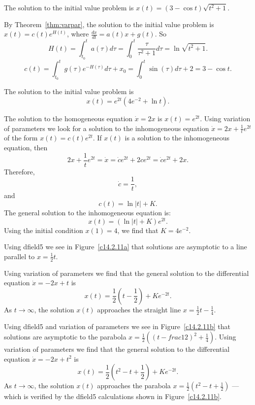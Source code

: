 \documentclass{ximera}
\begin{document}
 \ans The solution to the initial value problem is
$x(t) = (3 - \cos t)\sqrt{t^2 + 1}$.

\soln By Theorem~\ref{thm:varpar}, the
solution to the initial value problem is $x(t) = c(t)e^{H(t)}$, where
$\frac{dx}{dt} = a(t)x + g(t)$.  So
\[
H(t) = \int_{t_0}^t a(\tau)d\tau = \int_0^t\frac{\tau}{\tau^2 + 1}d\tau
= \ln\sqrt{t^2 + 1}.
\]
\[
c(t) = \int_{t_0}^t g(\tau)e^{-H(\tau)}d\tau + x_0
= \int_0^t \sin(\tau)d\tau + 2
= 3 - \cos t.
\]

 \ans The solution to the initial value problem is
\[
x(t) = e^{2t}(4e^{-2}+\ln t).
\]

\soln The solution to the homogeneous equation $\dot{x}=2x$ is $x(t)=e^{2t}$.
 Using variation of parameters we look for a solution to the inhomogeneous
equation $\dot{x}=2x+\frac{1}{t}e^{2t}$ of the form $x(t)=c(t)e^{2t}$.  If
$x(t)$ is a solution to the inhomogeneous equation, then
\[
2x+\frac{1}{t}e^{2t} =\dot{x}=\dot{c}e^{2t}+2ce^{2t} = \dot{c}e^{2t}+2x.
\]
Therefore, 
\[
\dot{c} = \frac{1}{t},
\]
and 
\[
c(t) = \ln|t| + K.
\]
The general solution to the inhomogeneous equation is:
\[
x(t) = (\ln|t| + K)e^{2t}.
\]
Using the initial condition $x(1)=4$, we find that $K=4e^{-2}$.



 Using {\sf dfield5} we see in Figure~\ref{c14.2.11a} that
solutions are asymptotic to a line parallel to $x=\frac{1}{2}t$.

\begin{figure}[htb]
     \centerline{%
     }
\end{figure} 
Using variation of parameters we find that the general solution to the
differential equation $\dot{x}=-2x+t$ is 
\[
x(t) = \frac{1}{2}\left(t-\frac{1}{2}\right) +Ke^{-2t}.
\]
As $t\to\infty$, the solution $x(t)$ approaches the straight line 
$x= \frac{1}{2}t-\frac{1}{4}$.

  Using {\sf dfield5} and variation of parameters we see in 
Figure~\ref{c14.2.11b} that solutions are asymptotic to the
parabola $x=\frac{1}{2}((t-frac{1}{2})^2+\frac{1}{4})$.
Using variation of parameters we find that the general solution to the
differential equation $\dot{x}=-2x+t^2$ is 
\[
x(t) = \frac{1}{2}\left(t^2-t+\frac{1}{2}\right) + Ke^{-2t}.
\]
As $t\to\infty$, the solution $x(t)$ approaches the parabola  
$x= \frac{1}{2}(t^2-t+\frac{1}{2})$ --- which is verified by the 
{\sf dfield5} calculations shown in Figure~\ref{c14.2.11b}.
\end{document}
